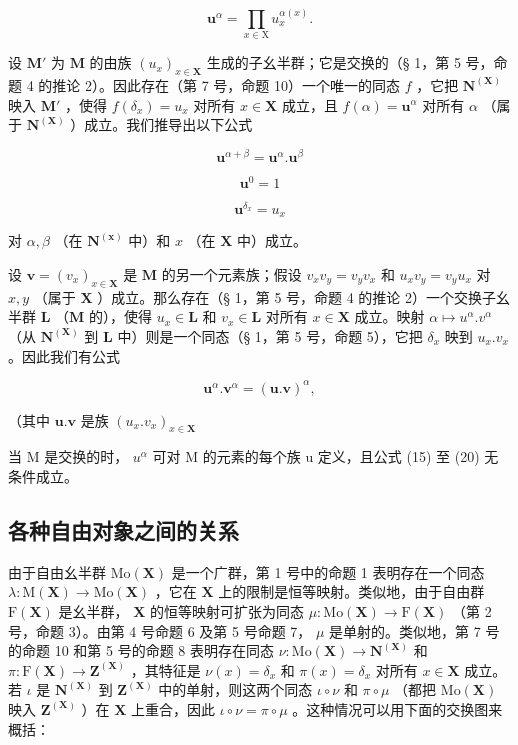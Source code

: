 \[
\mathbf {u} ^ {\alpha} = \prod_ {x \in \mathrm{X}} u _ {x} ^ {\alpha (x)}.\tag{16}
\]

设 \(\mathbf{M}'\) 为 \(\mathbf{M}\) 的由族 \((u_x)_{x\in \mathbf{X}}\) 生成的子幺半群；它是交换的（§ 1，第 5 号，命题 4 的推论 2）。因此存在（第 7 号，命题 10）一个唯一的同态 \(f\) ，它把 \(\mathbf{N}^{(\mathbf{X})}\) 映入 \(\mathbf{M}'\) ，使得 \(f(\delta_x) = u_x\) 对所有 \(x\in \mathbf{X}\) 成立，且 \(f(\alpha) = \mathbf{u}^{\alpha}\) 对所有 \(\alpha\) （属于 \(\mathbf{N}^{(\mathbf{X})}\) ）成立。我们推导出以下公式

\[
\mathbf {u} ^ {\alpha + \beta} = \mathbf {u} ^ {\alpha}. \mathbf {u} ^ {\beta}\tag{17}
\]

\[
\mathbf {u} ^ {0} = 1\tag{18}
\]

\[
\mathbf {u} ^ {\delta_ {x}} = u _ {x}\tag{19}
\]

对 \(\alpha, \beta\) （在 \(\mathbf{N}^{(\mathbf{x})}\) 中）和 \(x\) （在 \(\mathbf{X}\) 中）成立。

设 \(\mathbf{v} = (v_x)_{x \in \mathbf{X}}\) 是 \(\mathbf{M}\) 的另一个元素族；假设 \(v_x v_y = v_y v_x\) 和 \(u_x v_y = v_y u_x\) 对 \(x, y\) （属于 \(\mathbf{X}\) ）成立。那么存在（§ 1，第 5 号，命题 4 的推论 2）一个交换子幺半群 \(\mathbf{L}\) （\(\mathbf{M}\) 的），使得 \(u_x \in \mathbf{L}\) 和 \(v_x \in \mathbf{L}\) 对所有 \(x \in \mathbf{X}\) 成立。映射 \(\alpha \mapsto u^\alpha . v^\alpha\) （从 \(\mathbf{N}^{(\mathbf{X})}\) 到 \(\mathbf{L}\) 中）则是一个同态（§ 1，第 5 号，命题 5），它把 \(\delta_x\) 映到 \(u_x . v_x\) 。因此我们有公式

\[
\mathbf {u} ^ {\alpha}. \mathbf {v} ^ {\alpha} = (\mathbf {u}. \mathbf {v}) ^ {\alpha},\tag{20}
\]

（其中 \(\mathbf{u}.\mathbf{v}\) 是族 \((u_x.v_x)_{x\in \mathbf{X}}\)

当 M 是交换的时， \(u^{\alpha}\) 可对 M 的元素的每个族 u 定义，且公式 (15) 至 (20) 无条件成立。

\subsection{各种自由对象之间的关系}

由于自由幺半群 \(\mathrm{Mo}(\mathbf{X})\) 是一个广群，第 1 号中的命题 1 表明存在一个同态 \(\lambda: \mathrm{M}(\mathbf{X}) \to \mathrm{Mo}(\mathbf{X})\) ，它在 \(\mathbf{X}\) 上的限制是恒等映射。类似地，由于自由群 \(\mathrm{F}(\mathbf{X})\) 是幺半群， \(\mathbf{X}\) 的恒等映射可扩张为同态 \(\mu: \mathrm{Mo}(\mathbf{X}) \to \mathrm{F}(\mathbf{X})\) （第 2 号，命题 3）。由第 4 号命题 6 及第 5 号命题 7， \(\mu\) 是单射的。类似地，第 7 号的命题 10 和第 5 号的命题 8 表明存在同态 \(\nu: \mathrm{Mo}(\mathbf{X}) \to \mathbf{N}^{(\mathbf{X})}\) 和 \(\pi: \mathrm{F}(\mathbf{X}) \to \mathbf{Z}^{(\mathbf{X})}\) ，其特征是 \(\nu(x) = \delta_x\) 和 \(\pi(x) = \delta_x\) 对所有 \(x \in \mathbf{X}\) 成立。若 \(\iota\) 是 \(\mathbf{N}^{(\mathbf{X})}\) 到 \(\mathbf{Z}^{(\mathbf{X})}\) 中的单射，则这两个同态 \(\iota \circ \nu\) 和 \(\pi \circ \mu\) （都把 \(\mathrm{Mo}(\mathbf{X})\) 映入 \(\mathbf{Z}^{(\mathbf{X})}\) ）在 \(\mathbf{X}\) 上重合，因此 \(\iota \circ \nu = \pi \circ \mu\) 。这种情况可以用下面的交换图来概括：


